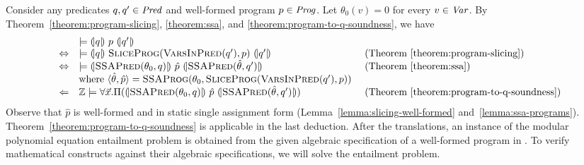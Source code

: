 
Consider any predicates $q, q' \in \mathit{Pred}$ and well-formed program $p \in
\mathit{Prog}$. Let $\theta_0 (v) = 0$ for every $v \in \mathit{Var}$. By
Theorem~\ref{theorem:program-slicing}, \ref{theorem:ssa}, and
\ref{theorem:program-to-q-soundness}, we have
\vspace{-.5em}
\begin{equation*}
  \begin{array}{cll}
    & \models \hoaretriple{q}{p}{q'}\\
    \Leftrightarrow
    & \models 
      \hoaretriple{q}{\textsc{SliceProg}(\textsc{VarsInPred}(q'), p)}{q'}
    & \textmd{ (Theorem~\ref{theorem:program-slicing})}\\
    \Leftrightarrow
    & \models
      \hoaretriple{\textsc{SSAPred}(\theta_0, q)}
      {\hat{p}}
      {\textsc{SSAPred}(\hat{\theta}, q')}
    & \textmd{ (Theorem~\ref{theorem:ssa})}\\
    &
      \textmd{where } \langle \hat{\theta}, \hat{p} \rangle = 
      \textsc{SSAProg} (\theta_0, \textsc{SliceProg}
      (\textsc{VarsInPred}(q'), p))\\
    \Leftarrow
    & \bbfZ \models \forall \vx.
      \Pi (\hoaretriple{\textsc{SSAPred}(\theta_0, q)} {\hat{p}}
      {\textsc{SSAPred}(\hat{\theta}, q')})
    & \textmd{ (Theorem~\ref{theorem:program-to-q-soundness})}
  \end{array}
\end{equation*}
Observe that $\hat{p}$ is well-formed and in static single assignment
form (Lemma~\ref{lemma:slicing-well-formed} and~\ref{lemma:ssa-programs}).
Theorem~\ref{theorem:program-to-q-soundness} is applicable in the last
deduction. After the translations, an instance of the modular
polynomial equation entailment problem is obtained from the given
algebraic specification of a well-formed program in \zdsl.
To verify mathematical constructs against their algebraic
specifications, we will solve the entailment problem.